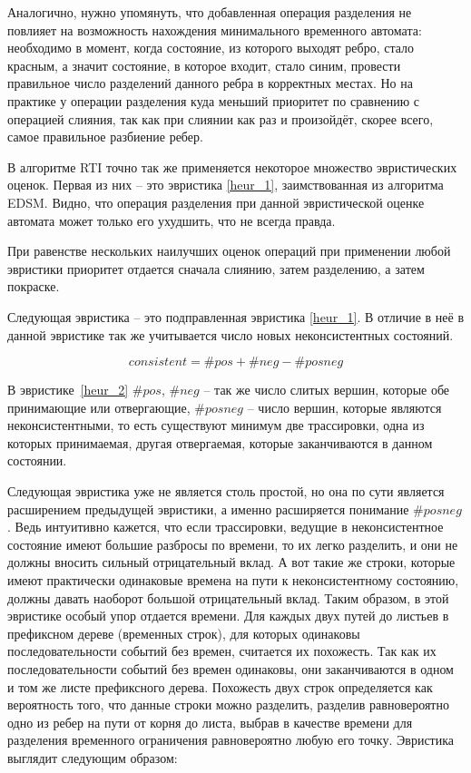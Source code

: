 \documentclass[times,specification,annotation]{itmo-student-thesis}
\begin{document}
Аналогично, нужно упомянуть, что добавленная операция разделения не повлияет на возможность нахождения минимального временного автомата: необходимо в момент, когда состояние, из которого
выходят ребро, стало красным, а значит состояние, в которое входит, стало синим, провести правильное число разделений данного ребра в корректных местах. Но на практике у операции
разделения куда меньший приоритет по сравнению с операцией слияния, так как при слиянии как раз и произойдёт, скорее всего, самое правильное разбиение ребер. 

В алгоритме RTI точно так же применяется некоторое множество эвристических оценок. Первая из них -- это эвристика \ref{heur_1}, заимствованная из алгоритма EDSM. 
Видно, что операция разделения при данной эвристической оценке автомата может только его ухудшить, что не всегда правда. 

При равенстве нескольких наилучших оценок операций при применении любой эвристики приоритет отдается сначала слиянию, затем разделению, а затем покраске.

Следующая эвристика -- это подправленная эвристика \ref{heur_1}. В отличие в неё в данной эвристике так же учитывается число новых неконсистентных состояний.

\begin{equation}
  consistent = \#pos + \#neg - \#posneg
  \label{heur_2}
\end{equation}

В эвристике~\ref{heur_2} $\#pos$, $\#neg$ -- так же число слитых вершин, которые обе принимающие или отвергающие, $\#posneg$ -- число вершин, которые являются неконсистентными, то есть
существуют минимум две трассировки, одна из которых принимаемая, другая отвергаемая, которые заканчиваются в данном состоянии.

Следующая эвристика уже не является столь простой, но она по сути является расширением предыдущей эвристики, а именно расширяется понимание $\#posneg$. Ведь интуитивно кажется, что
если трассировки, ведущие в неконсистентное состояние имеют большие разбросы по времени, то их легко разделить, и они не должны вносить сильный отрицательный вклад. А вот такие же строки,
которые имеют практически одинаковые времена на пути к неконсистентному состоянию, должны давать наоборот большой отрицательный вклад.
Таким образом, в этой эвристике особый упор отдается времени. Для каждых двух путей до листьев в префиксном дереве (временных строк), 
для которых одинаковы последовательности событий без времен, считается их похожесть. Так как их последовательности событий без времен одинаковы, они заканчиваются в одном и том же листе 
префиксного дерева. Похожесть двух строк определяется как вероятность того, что данные строки можно разделить, разделив равновероятно одно из ребер на пути от корня до листа, выбрав в качестве
времени для разделения временного ограничения равновероятно любую его точку. Эвристика выглядит следующим образом:
\end{document}

